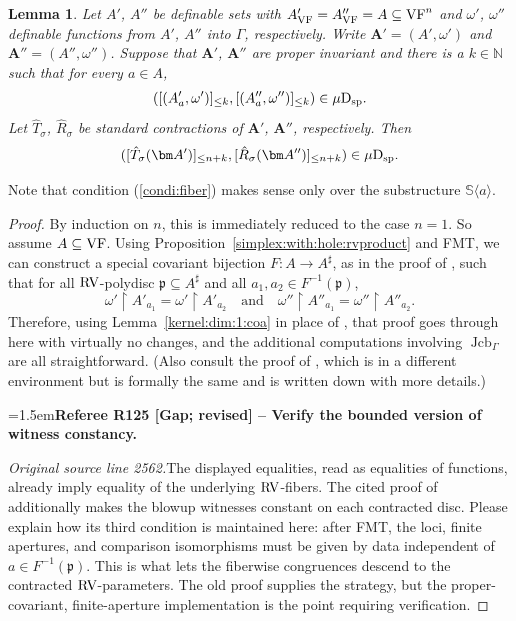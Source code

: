 \documentclass[12pt]{amsart}
\newcommand{\RefereeRemark}[4]{%
  \par\medskip\begingroup\normalfont\small\color{RefereePurple}%
  \emergencystretch=1.5em\noindent\textbf{Referee R#1 [#2] -- #3.}\par\nobreak\noindent #4\par
  \endgroup\medskip
}
\theoremstyle{plain}
\newtheorem{lem}[thm]{Lemma}
\theoremstyle{definition}
\theoremstyle{remark}
\numberwithin{equation}{section}
\theoremstyle{plain}
\newcommand{\VF}{\textup{VF}}
\newcommand{\RV}{\textup{RV}}
\DeclareMathOperator{\jcb}{Jcb}
\newcommand{\N}{\mathds{N}}
\newcommand{\dand}{\quad \text{and} \quad}
\newcommand{\gp}{\mathfrak{p}}
\newcommand{\0}{\emptyset}
\newcommand{\rest}{\upharpoonright}
\newcommand{\fun}{\longrightarrow}
\newcommand{\sub}{\subseteq}
\newcommand{\la}{\langle}
\newcommand{\ra}{\rangle}
\newcommand{\dsp}{\textup{D}_{\textup{sp}}}
\newcommand{\mispdb}{\mu \dsp}
\begin{document}
\begin{lem}\label{isp:VF:fiberwise:contract}
Let $A'$, $A''$ be definable sets with $A'_{\VF} = A''_{\VF} = A \sub \VF^n$ and $\omega'$, $\omega''$ definable functions from $A'$, $A''$ into $\Gamma$, respectively. Write $\bm A' = (A', \omega')$ and $\bm A'' = (A'', \omega'')$. Suppose that $\bm A'$, $\bm A''$ are proper invariant and there is a $k \in \N$ such that for  every $a \in A$,
\begin{equation}\label{condi:fiber}
([(A'_a, \omega')]_{\leq k}, [(A''_a, \omega'')]_{\leq k}) \in \mispdb.
\end{equation}
Let $\hat T_{\sigma}$, $\hat R_{\sigma}$ be standard contractions of $\bm A'$, $\bm A''$, respectively. Then
\[
([\hat T_{\sigma}(\bm A')]_{\leq n+k}, [\hat R_{\sigma}(\bm A'')]_{\leq n+k}) \in \mispdb.
\]
\end{lem}

Note that condition (\ref{condi:fiber}) makes sense only  over the substructure $\mathbb{S} \la a \ra$.

\begin{proof}
By induction on $n$, this is immediately reduced to the case $n=1$. So assume $A \sub \VF$. Using Proposition~\ref{simplex:with:hole:rvproduct} and FMT, we can construct a special covariant bijection $F : A \fun A^\sharp$, as in the proof of \cite[Lemma~6.14]{Yin:int:acvf}, such that for all $\RV$-polydisc $\gp \sub A^{\sharp}$ and all $a_1, a_2 \in F^{-1}(\gp)$,
\[
\omega' \rest A'_{a_1} = \omega' \rest A'_{a_2} \dand \omega'' \rest A''_{a_1} = \omega'' \rest A''_{a_2}.
\]
Therefore, using Lemma~\ref{kernel:dim:1:coa} in place of \cite[Corollary~6.11]{Yin:int:acvf}, that proof goes through here with virtually no changes, and the additional computations involving $\jcb_{\Gamma}$ are all straightforward. (Also consult the proof of \cite[Lemma~5.36]{Yin:tcon:I}, which is in a different environment but is formally the same and is  written down with more details.)

\RefereeRemark{125}{Gap; revised}{Verify the bounded version of witness constancy}{%
\textit{Original source line 2562.}\quad The displayed equalities, read as equalities of functions, already imply equality of the underlying $\RV$-fibers. The cited proof of \cite[Lemma~6.14]{Yin:int:acvf} additionally makes the blowup witnesses constant on each contracted disc. Please explain how its third condition is maintained here: after FMT, the loci, finite apertures, and comparison isomorphisms must be given by data independent of $a\in F^{-1}(\gp)$. This is what lets the fiberwise congruences descend to the contracted $\RV$-parameters. The old proof supplies the strategy, but the proper-covariant, finite-aperture implementation is the point requiring verification.
}
\end{proof}
\end{document}
